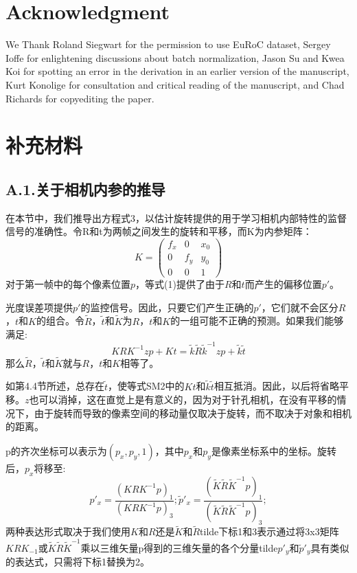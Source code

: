 \documentclass[10pt,journal,compsoc,UTF8]{IEEEtran}
\begin{document}
  \section*{Acknowledgment}
\fi
We Thank Roland Siegwart for the permission to use EuRoC dataset, Sergey Ioffe for enlightening discussions about batch normalization, Jason Su and Kwea Koi for spotting an error in the derivation in an earlier version of the manuscript, Kurt Konolige for consultation and critical reading of the manuscript, and Chad Richards for copyediting the paper.

\cleardoublepage
\section*{补充材料}
\subsection*{A.1.关于相机内参的推导}
在本节中，我们推导出方程式3，以估计旋转提供的用于学习相机内部特性的监督信号的准确性。令R和t为两帧之间发生的旋转和平移，而K为内参矩阵：
\begin{equation}
  K = \begin{pmatrix}
    f_x & 0 & x_0\\
    0 & f_y & y_0\\
    0  &  0  &  1
  \end{pmatrix}
  \tag{SM1}
\end{equation}
对于第一帧中的每个像素位置$p$，等式(1)提供了由于$R$和$t$而产生的偏移位置$p'$。

光度误差项提供$p'$的监控信号。因此，只要它们产生正确的$p'$，它们就不会区分$R$，$t$和$K$的组合。令$\tilde{R}$，$\tilde{t}$和$\tilde{K}$为$R$，$t$和$K$的一组可能不正确的预测。如果我们能够满足:
\begin{equation}
  KRK^{-1}zp+Kt=\tilde{k}\tilde{R}\tilde{k}^{-1}zp+\tilde{k}\tilde{t}
  \tag{SM2}
\end{equation}
那么$\tilde{R}$，$\tilde{t}$和$\tilde{K}$就与$R$，$t$和$K$相等了。

如第4.4节所述，总存在$\tilde{t}$，使等式SM2中的$Kt$和$\tilde{k}\tilde{t}$相互抵消。因此，以后将省略平移。$z$也可以消掉，这在直觉上是有意义的，因为对于针孔相机，在没有平移的情况下，由于旋转而导致的像素空间的移动量仅取决于旋转，而不取决于对象和相机的距离。

p的齐次坐标可以表示为$(p_x, p_y, 1)$，其中$p_x$和$p_y$是像素坐标系中的坐标。旋转后，$p_x$将移至:
\begin{equation}
  p'_x=\frac{(KRK^{-1}p)_1}{(KRK^{-1}p)_3};\tilde{p}'_x=\frac{(\tilde{K}\tilde{R}\tilde{K}^{-1}p)_1}{(\tilde{K}\tilde{R}\tilde{K}^{-1}p)_3};
  \tag{SM3}
\end{equation}
两种表达形式取决于我们使用$K$和$R$还是$\tilde{K}$和$\tilde{R}$tilde下标1和3表示通过将3x3矩阵$KRK_{-1}$或$\tilde{K}\tilde{R}\tilde{K}^{-1}$乘以三维矢量p得到的三维矢量的各个分量tilde$p'_y$和$\tilde{p}'_y$具有类似的表达式，只需将下标1替换为2。
\end{document}
